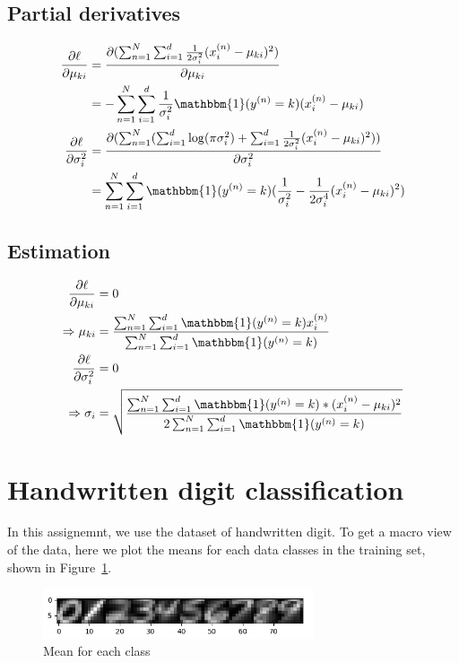 \documentclass[a4paper]{article}
\begin{document}
\subsection{Partial derivatives}

\begin{align*}
    \frac{\partial \ell}{\partial \mu_{ki}}&=\frac{\partial(\sum^N_{n=1}\sum^d_{i=1}\frac{1}{2\sigma^2_i}(x^{(n)}_i-\mu_{ki})^2)}{\partial \mu_{ki}}\\
    &=-\sum^N_{n=1}\sum^d_{i=1}\frac{1}{\sigma^2_i}\mathbbm{1}(y^{(n)}=k)(x^{(n)}_i-\mu_{ki})\\
    \frac{\partial \ell}{\partial \sigma_i^2}&=\frac{\partial(\sum^N_{n=1}(\sum^d_{i=1}\log(\pi\sigma^2_i)+\sum^d_{i=1}\frac{1}{2\sigma^2_i}(x^{(n)}_i-\mu_{ki})^2))}{\partial \sigma_i^2}\\
    &=\sum^N_{n=1}\sum^d_{i=1}\mathbbm{1}(y^{(n)}=k)(\frac{1}{\sigma^2_i}-\frac{1}{2\sigma^4_i}(x^{(n)}_i-\mu_{ki})^2)
\end{align*}

\subsection{Estimation}

\begin{align*}
    \frac{\partial \ell}{\partial \mu_{ki}}&=0\\
    \Rightarrow\mu_{ki}&=\frac{\sum^N_{n=1}\sum^d_{i=1}\mathbbm{1}(y^{(n)}=k)x^{(n)}_i}{\sum^N_{n=1}\sum^d_{i=1}\mathbbm{1}(y^{(n)}=k)}\\
    \frac{\partial \ell}{\partial \sigma_i^2}&=0\\
    \Rightarrow\sigma_i&=\sqrt{\frac{\sum^N_{n=1}\sum^d_{i=1}\mathbbm{1}(y^{(n)}=k)*(x^{(n)}_i-\mu_{ki})^2}{2\sum^N_{n=1}\sum^d_{i=1}\mathbbm{1}(y^{(n)}=k)}}
\end{align*}

\section{Handwritten digit classification}

In this assignemnt, we use the dataset of handwritten digit. To get a macro view of the data, here we plot the means for each data classes in the training set, shown in Figure~\ref{fig: Trainging_data_mean}.

\begin{figure}[htbp]
\centering
\includegraphics[width = 8cm]{Trainging_data_mean}
\caption{Mean for each class}
\label{fig: Trainging_data_mean}
\end{figure}
\end{document}
